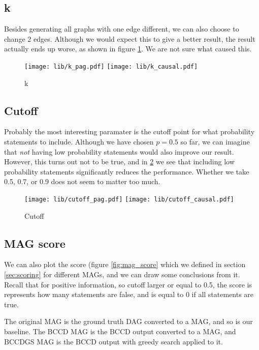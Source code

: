 \documentclass[11pt,a4paper]{report}
\theoremstyle{definition}
\begin{document}
\subsection{k}
Besides generating all graphs with one edge different, we can also choose
to change 2 edges. Although we would expect this to give a better result,
the result actually ends up worse, as shown in figure \ref{fig:k_causal}.
We are not sure what caused this.
\begin{figure}
  \centering
  \texttt{[image: lib/k\_pag.pdf]}
  \texttt{[image: lib/k\_causal.pdf]}
  \caption{k}
  \label{fig:k_causal}
\end{figure}

\subsection{Cutoff}
Probably the most interesting paramater is the cutoff point for what
probability statements to include. Although we have chosen $p=0.5$ so far,
we can imagine that \emph{not} having low probability statements would
also improve our result. However, this turns out not to be true, and in
\ref{fig:cutoff_causal} we see that including low probability statements
significantly reduces the performance. Whether we take 0.5, 0.7, or 0.9
does not seem to matter too much.
\begin{figure}
  \centering
  \texttt{[image: lib/cutoff\_pag.pdf]}
  \texttt{[image: lib/cutoff\_causal.pdf]}
  \caption{Cutoff}
  \label{fig:cutoff_causal}
\end{figure}

\subsection{MAG score}
We can also plot the score (figure \ref{fig:mag_score} which we defined in
section \ref{sec:scoring} for different MAGs, and we can draw some
conclusions from it. Recall that for positive information, so cutoff
larger or equal to 0.5, the score is represents how many statements are
false, and is equal to 0 if all statements are true.

The original MAG is the ground truth DAG converted to a MAG, and so is our
baseline. The BCCD MAG is the BCCD output converted to a MAG, and BCCDGS
MAG is the BCCD output with greedy search applied to it. 
\end{document}
